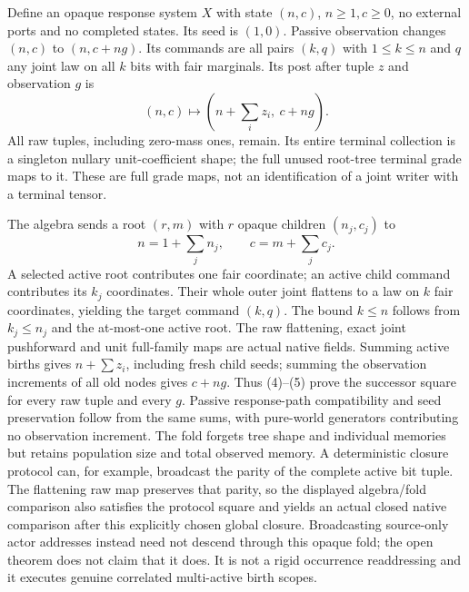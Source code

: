 \documentclass[11pt]{article}
\begin{document}
Define an opaque response system $X$ with state $(n,c)$, $n\geq1,c\geq0$, no external ports and no completed states. Its seed is $(1,0)$. Passive observation changes $(n,c)$ to $(n,c+ng)$. Its commands are all pairs $(k,q)$ with $1\leq k\leq n$ and $q$ any joint law on all $k$ bits with fair marginals. Its post after tuple $z$ and observation $g$ is
\[
             (n,c)\longmapsto(n+\textstyle\sum_i z_i,\ c+ng). \tag{4}
\]
All raw tuples, including zero-mass ones, remain. Its entire terminal collection is a singleton nullary unit-coefficient shape; the full unused root-tree terminal grade maps to it. These are full grade maps, not an identification of a joint writer with a terminal tensor.

The algebra sends a root $(r,m)$ with $r$ opaque children $(n_j,c_j)$ to
\[
                     n=1+\sum_jn_j,\qquad c=m+\sum_jc_j. \tag{5}
\]
A selected active root contributes one fair coordinate; an active child command contributes its $k_j$ coordinates. Their whole outer joint flattens to a law on $k$ fair coordinates, yielding the target command $(k,q)$. The bound $k\leq n$ follows from $k_j\leq n_j$ and the at-most-one active root. The raw flattening, exact joint pushforward and unit full-family maps are actual native fields. Summing active births gives $n+\sum z_i$, including fresh child seeds; summing the observation increments of all old nodes gives $c+ng$. Thus (4)--(5) prove the successor square for every raw tuple and every $g$. Passive response-path compatibility and seed preservation follow from the same sums, with pure-world generators contributing no observation increment. The fold forgets tree shape and individual memories but retains population size and total observed memory. A deterministic closure protocol can, for example, broadcast the parity of the complete active bit tuple. The flattening raw map preserves that parity, so the displayed algebra/fold comparison also satisfies the protocol square and yields an actual closed native comparison after this explicitly chosen global closure. Broadcasting source-only actor addresses instead need not descend through this opaque fold; the open theorem does not claim that it does. It is not a rigid occurrence readdressing and it executes genuine correlated multi-active birth scopes.
\end{document}
